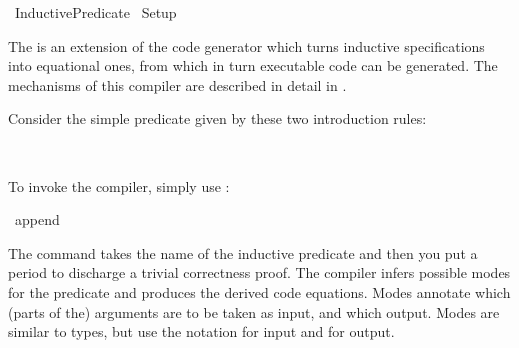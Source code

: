%
\begin{isabellebody}%
\def\isabellecontext{Inductive{\isacharunderscore}Predicate}%
%
\isadelimtheory
%
\endisadelimtheory
%
\isatagtheory
{}\isamarkupfalse%
\ Inductive{\isacharunderscore}Predicate\isanewline
{}\ Setup\isanewline
{}\isanewline
%
\endisatagtheory
{\isafoldtheory}%
%
\isadelimtheory
%
\endisadelimtheory
%
\isadeliminvisible
%
\endisadeliminvisible
%
\isataginvisible
%
\endisataginvisible
{\isafoldinvisible}%
%
\isadeliminvisible
%
\endisadeliminvisible
%
\isamarkuptrue%
%
\begin{isamarkuptext}%
The  is an extension of the code generator
  which turns inductive specifications into equational ones, from
  which in turn executable code can be generated.  The mechanisms of
  this compiler are described in detail in
  \cite{Berghofer-Bulwahn-Haftmann:2009:TPHOL}.

  Consider the simple predicate  given by these two
  introduction rules:%
\end{isamarkuptext}%
\isamarkuptrue%
%
\isadelimquote
%
\endisadelimquote
%
\isatagquote
%
\begin{isamarkuptext}%
 \\
\end{isamarkuptext}%
\isamarkuptrue%
%
\endisatagquote
{\isafoldquote}%
%
\isadelimquote
%
\endisadelimquote
%
\begin{isamarkuptext}%
\noindent To invoke the compiler, simply use \hypertarget{command.code-pred}{\hyperlink{command.code-pred}{\mbox{}}}:%
\end{isamarkuptext}%
\isamarkuptrue%
%
\isadelimquote
%
\endisadelimquote
%
\isatagquote
{}\isamarkupfalse%
\ append\ \isacommand{{\isachardot}}\isamarkupfalse%
%
\endisatagquote
{\isafoldquote}%
%
\isadelimquote
%
\endisadelimquote
%
\begin{isamarkuptext}%
\noindent The \hyperlink{command.code-pred}{\mbox{}} command takes the name of the
  inductive predicate and then you put a period to discharge a trivial
  correctness proof.  The compiler infers possible modes for the
  predicate and produces the derived code equations.  Modes annotate
  which (parts of the) arguments are to be taken as input, and which
  output. Modes are similar to types, but use the notation 
  for input and  for output.
 

\end{isamarkuptext}
\end{isabellebody}
